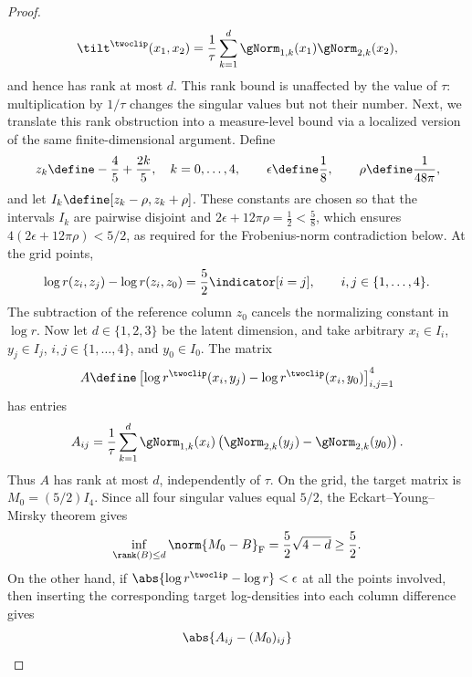 \documentclass{article}
\begin{document}
\begin{proof}
 \begin{align*}
  \tilt^{\twoclip}(x_1,x_2)
  =\frac{1}{\tau}\sum_{k=1}^d
  \gNorm_{1,k}(x_1)\gNorm_{2,k}(x_2),
 \end{align*}
 and hence has rank at most $d$. This rank bound is unaffected by the value
 of $\tau$: multiplication by $1/\tau$ changes the singular values but not
 their number.
 Next, we translate this rank obstruction into a measure-level bound via a
 localized version of the same finite-dimensional argument. Define
 \begin{align*}
  z_k\define-\frac45+\frac{2k}{5},\quad k=0,\ldots,4,
  \qquad
  \epsilon\define\frac18,
  \qquad
  \rho\define\frac{1}{48\pi},
 \end{align*}
 and let $I_k\define[z_k-\rho,z_k+\rho]$.
 These constants are chosen so that the intervals $I_k$ are pairwise
  disjoint and $2\epsilon+12\pi\rho=\frac12<\frac58$,
  which ensures $4(2\epsilon+12\pi\rho)<5/2$, as required for the
  Frobenius-norm contradiction below. At the grid points,
 \begin{align*}
  \log r(z_i,z_j)-\log r(z_i,z_0)
  =\frac52\indicator[i=j],
  \qquad i,j\in\{1,\ldots,4\}.
 \end{align*}
 The subtraction of the reference column $z_0$ cancels the normalizing
 constant in $\log r$. Now let $d\in\{1,2,3\}$ be the latent dimension,
 and take arbitrary $x_i\in I_i$, $y_j\in I_j$, $i,j\in\{1,\ldots,4\}$,
 and $y_0\in I_0$. The matrix
 \begin{align*}
  A\define\left[
   \log r^{\twoclip}(x_i,y_j)-
   \log r^{\twoclip}(x_i,y_0)
   \right]_{i,j=1}^4
 \end{align*}
 has entries
 \begin{align*}
  A_{ij}=\frac{1}{\tau}\sum_{k=1}^d
  \gNorm_{1,k}(x_i)
  \left(\gNorm_{2,k}(y_j)-\gNorm_{2,k}(y_0)\right).
 \end{align*}
 Thus $A$ has rank at most $d$, independently of $\tau$. On the grid, the
 target matrix is $M_0=(5/2)I_4$. Since all four singular values equal $5/2$,
 the Eckart--Young--Mirsky
  \citep{eckartApproximationOneMatrix1936}
 theorem gives
 \begin{align*}
  \inf_{\rank(B)\leq d}\norm{M_0-B}_{\mathrm{F}}
  =\frac52\sqrt{4-d}\geq\frac52.
 \end{align*}
 On the other hand, if
 $\abs{\log r^{\twoclip}-\log r}<\epsilon$ at all the points involved,
 then inserting the corresponding target log-densities into each column
 difference gives
 \begin{align*}
  \abs{A_{ij}-(M_0)_{ij}}

\end{align*}
\end{proof}
\end{document}
